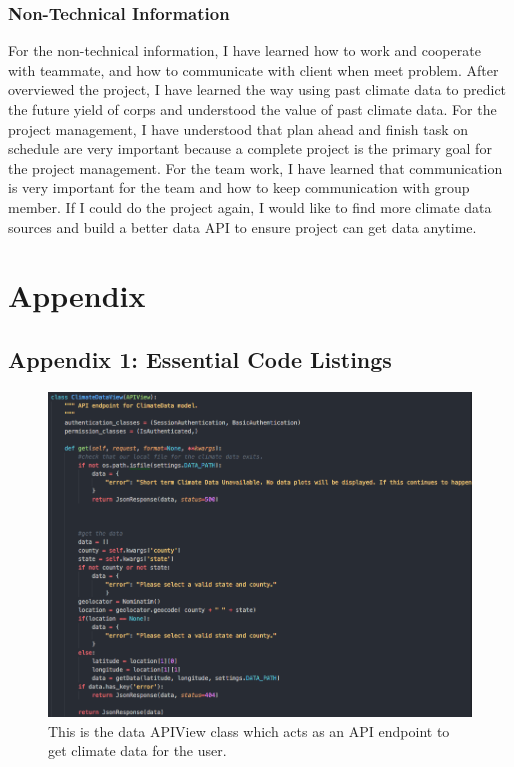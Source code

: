 \documentclass[onecolumn, draftclsnofoot,10pt, compsoc]{article}
\begin{document}
            \subsubsection{Non-Technical Information}
			For the non-technical information, I have learned how to work and cooperate with teammate, and how to communicate with client when meet problem.
			After overviewed the project, I have learned the way using past climate data to predict the future yield of corps and understood the value of past climate data.
			For the project management, I have understood that plan ahead and finish task on schedule are very important because a complete project is the primary goal for the project management.
			For the team work, I have learned that communication is very important for the team and how to keep communication with group member.
			If I could do the project again, I would like to find more climate data sources and build a better data API to ensure project can get data anytime.


\section{Appendix}

    \subsection{Appendix 1: Essential Code Listings}
        \begin{figure}[h!]
            \includegraphics[width=18cm]{./Images/dataView.png}
            \caption{This is the data APIView class which acts as an API endpoint to get climate data for the user.}
            \label{code-listing: DataView}
        \end{figure}
         
\end{document}
